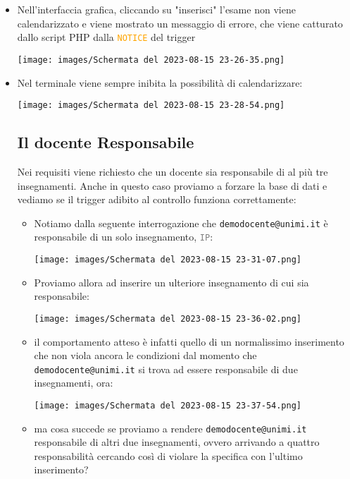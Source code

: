 \documentclass{article}
\newcommand{\attr}[1]{\texttt{\textcolor{gray}{#1}}}
\newcommand{\sqlcommand}[1]{\texttt{\textcolor{orange}{#1}}}
\newcommand{\und}[0]{\textunderscore}
\begin{document}
\begin{itemize}
    \item Nell'interfaccia grafica, cliccando su "inserisci" l'esame non viene calendarizzato e viene mostrato un messaggio di errore, che viene catturato dallo script PHP dalla \sqlcommand{NOTICE} del trigger

    \texttt{[image: images/Schermata del 2023-08-15 23-26-35.png]}

    \item Nel terminale viene sempre inibita la possibilità di calendarizzare:

    \texttt{[image: images/Schermata del 2023-08-15 23-28-54.png]}


    \pagebreak

    \subsection{Il docente Responsabile}
    Nei requisiti viene richiesto che un docente sia responsabile di al più tre insegnamenti. Anche in questo caso proviamo a forzare la base di dati e vediamo se il trigger adibito al controllo funziona correttamente:
    \begin{itemize}
        \item Notiamo dalla seguente interrogazione che \texttt{demo\und docente@unimi.it} è responsabile di un solo insegnamento, \attr{IP}:

        \texttt{[image: images/Schermata del 2023-08-15 23-31-07.png]}

        \item Proviamo allora ad inserire un ulteriore insegnamento di cui sia responsabile:

        \texttt{[image: images/Schermata del 2023-08-15 23-36-02.png]}

        \item il comportamento atteso è infatti quello di un normalissimo inserimento che non viola ancora le condizioni dal momento che \texttt{demo\und docente@unimi.it} si trova ad essere responsabile di due insegnamenti, ora:

        \texttt{[image: images/Schermata del 2023-08-15 23-37-54.png]}

        \item ma cosa succede se proviamo a rendere \texttt{demo\und docente@unimi.it} responsabile di altri due insegnamenti, ovvero arrivando a quattro responsabilità cercando così di violare la specifica con l'ultimo inserimento?


\end{itemize}
\end{itemize}
\end{document}
